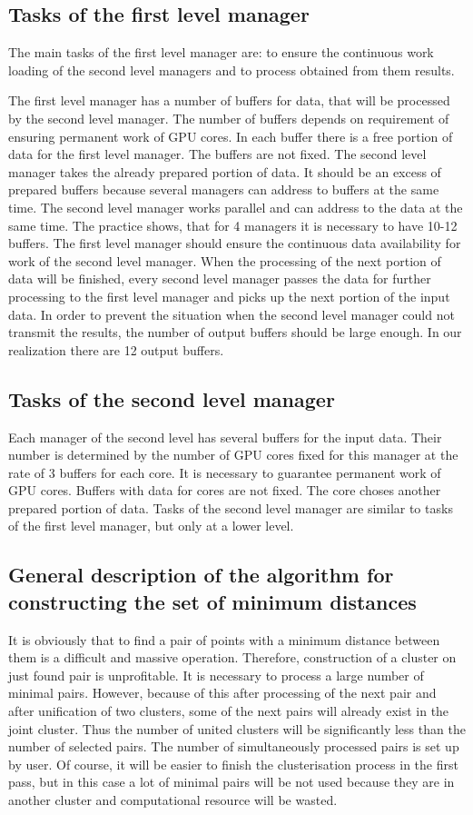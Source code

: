 \documentclass{TAACpaper}
\begin{document}
\subsection{Tasks of the first level manager}
The main tasks of the first level manager are: to ensure the continuous work loading of the second level managers and to process obtained from them results. 

The first level manager has a number of buffers for data, that will be processed by the  second level manager. The number of buffers depends on requirement of ensuring permanent work of GPU cores. In each buffer there is a free portion of data for the first level manager. The buffers are not fixed. The second level manager takes the already prepared portion of data. It should be an excess of prepared buffers because several managers can address to buffers at the same time. The second level manager works parallel and can address to the data at the same time. The practice shows, that for 4 managers it is necessary to have 10-12 buffers. The first level manager should ensure the continuous data availability for work of the second level manager. When the processing of the next portion of data will be finished, every second level manager passes the data for further processing to the first level manager and picks up the next portion of the input data. In order to prevent the situation when the second level manager could not transmit the results, the number of output buffers should be large enough. In our realization there are 12 output buffers.

\subsection{Tasks of the second level manager}
Each manager of the second level has several buffers for the input data. Their number is determined by the number of GPU cores fixed for this manager at the rate of 3 buffers for each core. It is necessary to guarantee permanent work of GPU cores. Buffers with data for cores are not fixed. The core choses another prepared portion of data. Tasks of the second level manager are similar to tasks of the first level manager, but only at a lower level.

\subsection{General description of the algorithm for constructing the set of minimum distances}
It is obviously that to find a pair of points with a minimum distance between them is a difficult and massive operation. Therefore, construction of a cluster on just found pair is unprofitable. It is necessary to process a large number of minimal pairs. However, because of this after processing of the next pair and after unification of two clusters, some of the next pairs will already exist in the joint cluster. Thus the number of united clusters will be significantly less than the number of selected pairs. The number of simultaneously processed pairs is set up by user. Of course, it will be easier to finish the clusterisation process in the first pass, but in this case a lot of minimal pairs will be not used because they are in another cluster and computational resource will be wasted. 
\end{document}
